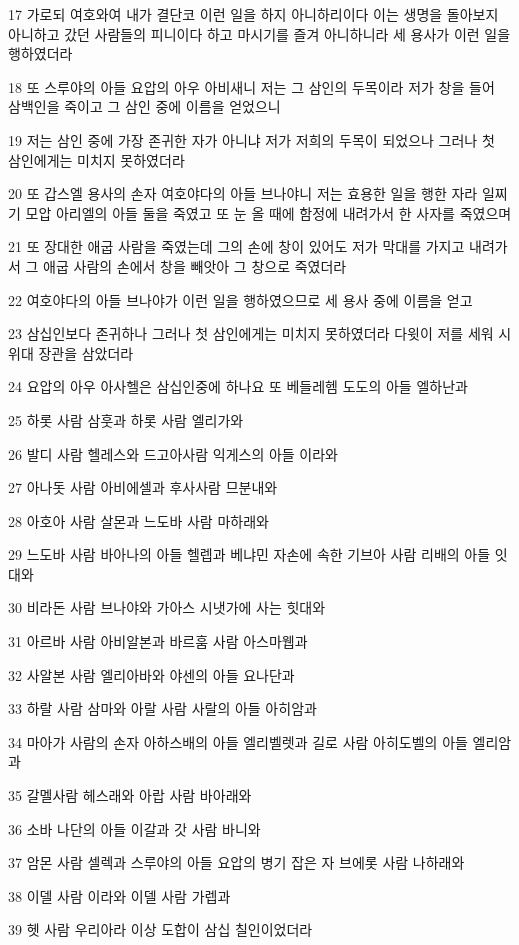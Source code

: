 \par 17 가로되 여호와여 내가 결단코 이런 일을 하지 아니하리이다 이는 생명을 돌아보지 아니하고 갔던 사람들의 피니이다 하고 마시기를 즐겨 아니하니라 세 용사가 이런 일을 행하였더라
\par 18 또 스루야의 아들 요압의 아우 아비새니 저는 그 삼인의 두목이라 저가 창을 들어 삼백인을 죽이고 그 삼인 중에 이름을 얻었으니
\par 19 저는 삼인 중에 가장 존귀한 자가 아니냐 저가 저희의 두목이 되었으나 그러나 첫 삼인에게는 미치지 못하였더라
\par 20 또 갑스엘 용사의 손자 여호야다의 아들 브나야니 저는 효용한 일을 행한 자라 일찌기 모압 아리엘의 아들 둘을 죽였고 또 눈 올 때에 함정에 내려가서 한 사자를 죽였으며
\par 21 또 장대한 애굽 사람을 죽였는데 그의 손에 창이 있어도 저가 막대를 가지고 내려가서 그 애굽 사람의 손에서 창을 빼앗아 그 창으로 죽였더라
\par 22 여호야다의 아들 브나야가 이런 일을 행하였으므로 세 용사 중에 이름을 얻고
\par 23 삼십인보다 존귀하나 그러나 첫 삼인에게는 미치지 못하였더라 다윗이 저를 세워 시위대 장관을 삼았더라
\par 24 요압의 아우 아사헬은 삼십인중에 하나요 또 베들레헴 도도의 아들 엘하난과
\par 25 하롯 사람 삼훗과 하롯 사람 엘리가와
\par 26 발디 사람 헬레스와 드고아사람 익게스의 아들 이라와
\par 27 아나돗 사람 아비에셀과 후사사람 므분내와
\par 28 아호아 사람 살몬과 느도바 사람 마하래와
\par 29 느도바 사람 바아나의 아들 헬렙과 베냐민 자손에 속한 기브아 사람 리배의 아들 잇대와
\par 30 비라돈 사람 브나야와 가아스 시냇가에 사는 힛대와
\par 31 아르바 사람 아비알본과 바르훔 사람 아스마웹과
\par 32 사알본 사람 엘리아바와 야센의 아들 요나단과
\par 33 하랄 사람 삼마와 아랄 사람 사랄의 아들 아히암과
\par 34 마아가 사람의 손자 아하스배의 아들 엘리벨렛과 길로 사람 아히도벨의 아들 엘리암과
\par 35 갈멜사람 헤스래와 아랍 사람 바아래와
\par 36 소바 나단의 아들 이갈과 갓 사람 바니와
\par 37 암몬 사람 셀렉과 스루야의 아들 요압의 병기 잡은 자 브에롯 사람 나하래와
\par 38 이델 사람 이라와 이델 사람 가렙과
\par 39 헷 사람 우리아라 이상 도합이 삼십 칠인이었더라

